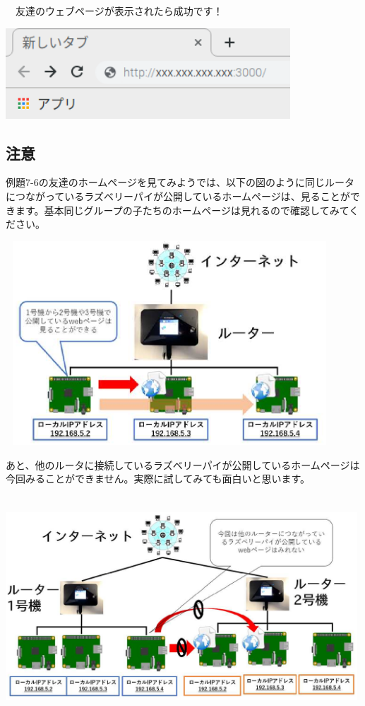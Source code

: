 \documentclass[a4paper,12pt,dvipdfmx]{jarticle}
\begin{document}
\ \ 友達のウェブページが表示されたら成功です！


\bigskip


\centering
\includegraphics[width=10.659cm,height=3.387cm]{ome7-img043.png}
\flushleft

\clearpage\subsection*{\bfseries
	注意}

例題7-6の友達のホームページを見てみようでは、以下の図のように同じルータにつながっているラズベリーパイが公開しているホームページは、見ることができます。基本同じグループの子たちのホームページは見れるので確認してみてください。

\centering
\includegraphics[width=12.284cm,height=7.632cm]{ome7-img044}
\flushleft


\bigskip


\bigskip



あと、他のルータに接続しているラズベリーパイが公開しているホームページは今回みることができません。実際に試してみても面白いと思います。


\bigskip

\centering
\includegraphics[width=13.166cm,height=8.239cm]{ome7-img045}
\flushleft
\end{document}
